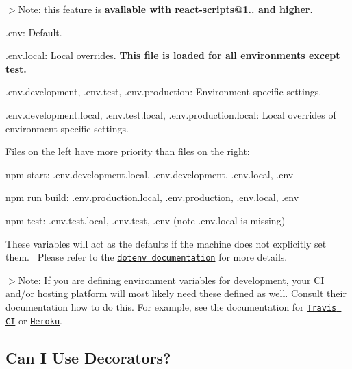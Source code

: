 $>$Note\+: this feature is {\bfseries available with {\ttfamily react-\/scripts@1..} and higher}.


\begin{DoxyItemize}
\item {\ttfamily .env}\+: Default.
\item {\ttfamily .env.\+local}\+: Local overrides. {\bfseries This file is loaded for all environments except test.}
\item {\ttfamily .env.\+development}, {\ttfamily .env.\+test}, {\ttfamily .env.\+production}\+: Environment-\/specific settings.
\item {\ttfamily .env.\+development.\+local}, {\ttfamily .env.\+test.\+local}, {\ttfamily .env.\+production.\+local}\+: Local overrides of environment-\/specific settings.
\end{DoxyItemize}

Files on the left have more priority than files on the right\+:


\begin{DoxyItemize}
\item {\ttfamily npm start}\+: {\ttfamily .env.\+development.\+local}, {\ttfamily .env.\+development}, {\ttfamily .env.\+local}, {\ttfamily .env}
\item {\ttfamily npm run build}\+: {\ttfamily .env.\+production.\+local}, {\ttfamily .env.\+production}, {\ttfamily .env.\+local}, {\ttfamily .env}
\item {\ttfamily npm test}\+: {\ttfamily .env.\+test.\+local}, {\ttfamily .env.\+test}, {\ttfamily .env} (note {\ttfamily .env.\+local} is missing)
\end{DoxyItemize}

These variables will act as the defaults if the machine does not explicitly set them.~\newline
 Please refer to the \href{https://github.com/motdotla/dotenv}{\tt dotenv documentation} for more details.

$>$Note\+: If you are defining environment variables for development, your CI and/or hosting platform will most likely need these defined as well. Consult their documentation how to do this. For example, see the documentation for \href{https://docs.travis-ci.com/user/environment-variables/}{\tt Travis CI} or \href{https://devcenter.heroku.com/articles/config-vars}{\tt Heroku}.

\subsection*{Can I Use Decorators?}

